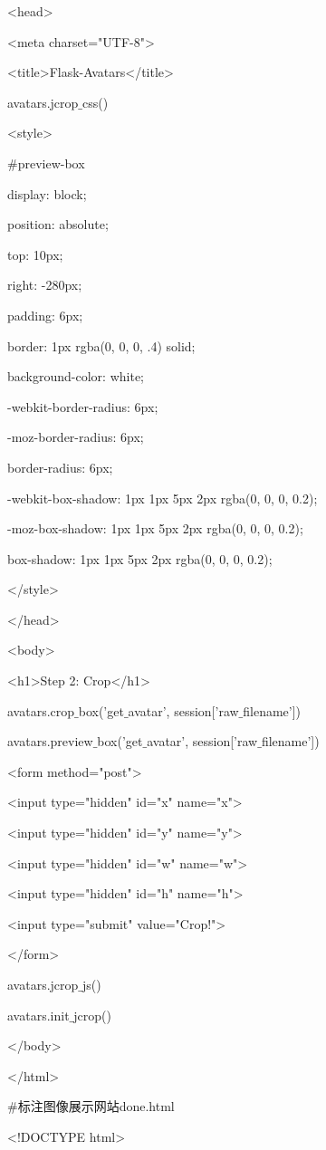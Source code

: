 \documentclass[bachelor_p]{hdu-thesis}
\begin{document}
<head>

<meta charset="UTF-8">

<title>Flask-Avatars</title>

{{ avatars.jcrop$\_$css() }}

<style>

$\#$preview-box {

display: block;

position: absolute;

top: 10px;

right: -280px;

padding: 6px;

border: 1px rgba(0, 0, 0, .4) solid;

background-color: white;

-webkit-border-radius: 6px;

-moz-border-radius: 6px;

border-radius: 6px;

-webkit-box-shadow: 1px 1px 5px 2px rgba(0, 0, 0, 0.2);

-moz-box-shadow: 1px 1px 5px 2px rgba(0, 0, 0, 0.2);

box-shadow: 1px 1px 5px 2px rgba(0, 0, 0, 0.2);

}

</style>

</head>

<body>

<h1>Step 2: Crop</h1>

{{ avatars.crop$\_$box('get$\_$avatar', session['raw$\_$filename']) }}

{{ avatars.preview$\_$box('get$\_$avatar', session['raw$\_$filename']) }}

<form method="post">

<input type="hidden" id="x" name="x">

<input type="hidden" id="y" name="y">

<input type="hidden" id="w" name="w">

<input type="hidden" id="h" name="h">

<input type="submit" value="Crop!">

</form>

{{ avatars.jcrop$\_$js() }}

{{ avatars.init$\_$jcrop() }}

</body>

</html>

$\#$标注图像展示网站done.html

<!DOCTYPE html>
\end{document}
